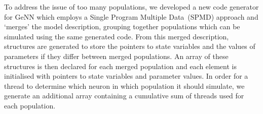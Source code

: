 \documentclass[9pt,a4paper]{amsart}
\begin{document}
To address the issue of too many populations, we developed a new code generator for GeNN which employs a Single Program Multiple Data~(SPMD) approach and `merges' the model description, grouping together populations which can be simulated using the same generated code.
From this merged description, structures are generated to store the pointers to state variables and the values of parameters if they differ between merged populations.
%
%
An array of these structures is then declared for each merged population and each element is initialised with pointers to state variables and parameter values.
%
%
In order for a thread to determine which neuron in which population it should simulate, we generate an additional array containing a cumulative sum of threads used for each population.
%
\end{document}
